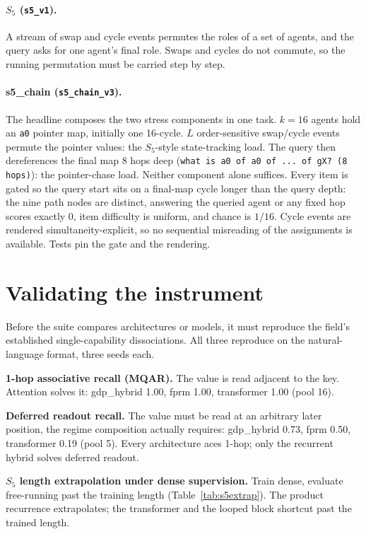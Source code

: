 \documentclass[11pt]{article}
\newcommand{\Sfive}{$S_5$}
\newcommand{\code}[1]{\texttt{#1}}
\begin{document}
\paragraph{\Sfive{} (\code{s5\_v1}).} A stream of swap and cycle events permutes the roles of
a set of agents, and the query asks for one agent's final role. Swaps and cycles do not
commute, so the running permutation must be carried step by step.

\paragraph{s5\_chain (\code{s5\_chain\_v3}).} The headline composes the two stress components
in one task. $k=16$ agents hold an \code{a0} pointer map, initially one 16-cycle. $L$
order-sensitive swap/cycle events permute the pointer values: the \Sfive-style state-tracking
load. The query then dereferences the final map 8 hops deep (\code{what is a0 of a0 of ... of
gX? (8 hops)}): the pointer-chase load. Neither component alone suffices. Every item is gated
so the query start sits on a final-map cycle longer than the query depth: the nine path nodes
are distinct, answering the queried agent or any fixed hop scores exactly 0, item difficulty
is uniform, and chance is $1/16$. Cycle events are rendered simultaneity-explicit, so no
sequential misreading of the assignments is available. Tests pin the gate and the rendering.

\section{Validating the instrument}

Before the suite compares architectures or models, it must reproduce the field's established
single-capability dissociations. All three reproduce on the natural-language format, three
seeds each.

\textbf{1-hop associative recall (MQAR).} The value is read adjacent to the key. Attention
solves it: gdp\_hybrid 1.00, fprm 1.00, transformer 1.00 (pool 16).

\textbf{Deferred readout recall.} The value must be read at an arbitrary later position, the
regime composition actually requires: gdp\_hybrid 0.73, fprm 0.50, transformer 0.19 (pool 5).
Every architecture aces 1-hop; only the recurrent hybrid solves deferred readout.

\textbf{\Sfive{} length extrapolation under dense supervision.} Train dense, evaluate
free-running past the training length (Table~\ref{tab:s5extrap}). The product recurrence
extrapolates; the transformer and the looped block shortcut past the trained length.
\end{document}
